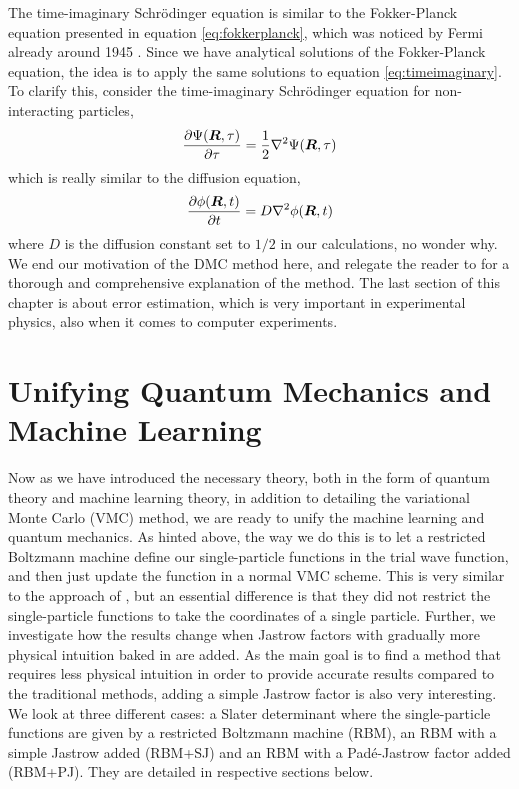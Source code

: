 The time-imaginary Schrödinger equation is similar to the Fokker-Planck equation presented in equation \eqref{eq:fokkerplanck}, which was noticed by Fermi already around 1945 \cite{metropolis_monte_1949,ceperley_quantum_1986}. Since we have analytical solutions of the Fokker-Planck equation, the idea is to apply the same solutions to equation \eqref{eq:timeimaginary}. To clarify this, consider the time-imaginary Schrödinger equation for non-interacting particles,
\begin{equation}
\frac{\partial\Psi(\boldsymbol{{R}},\tau)}{\partial\tau}=\frac{1}{2}\nabla^2\Psi(\boldsymbol{{R}},\tau)
\end{equation}
which is really similar to the diffusion equation,
\begin{equation}
\frac{\partial\phi(\boldsymbol{{R}},t)}{\partial t}=D\nabla^2\phi(\boldsymbol{{R}},t)
\end{equation}
where $D$ is the diffusion constant set to $1/2$ in our calculations, no wonder why. We end our motivation of the DMC method here, and relegate the reader to \citet{kosztin_introduction_1996} for a thorough and comprehensive explanation of the method. The last section of this chapter is about error estimation, which is very important in experimental physics, also when it comes to computer experiments. 

\section{Unifying Quantum Mechanics and Machine Learning}
Now as we have introduced the necessary theory, both in the form of quantum theory and machine learning theory, in addition to detailing the variational Monte Carlo (VMC) method, we are ready to unify the machine learning and quantum mechanics. As hinted above, the way we do this is to let a restricted Boltzmann machine define our single-particle functions in the trial wave function, and then just update the function in a normal VMC scheme. This is very similar to the approach of \citet{pfau2019abinitio}, but an essential difference is that they did not restrict the single-particle functions to take the coordinates of a single particle. Further, we investigate how the results change when Jastrow factors with gradually more physical intuition baked in are added. As the main goal is to find a method that requires less physical intuition in order to provide accurate results compared to the traditional methods, adding a simple Jastrow factor is also very interesting. We look at three different cases: a Slater determinant where the single-particle functions are given by a restricted Boltzmann machine (RBM), an RBM with a simple Jastrow added (RBM+SJ) and an RBM with a Padé-Jastrow factor added (RBM+PJ). They are detailed in respective sections below.

